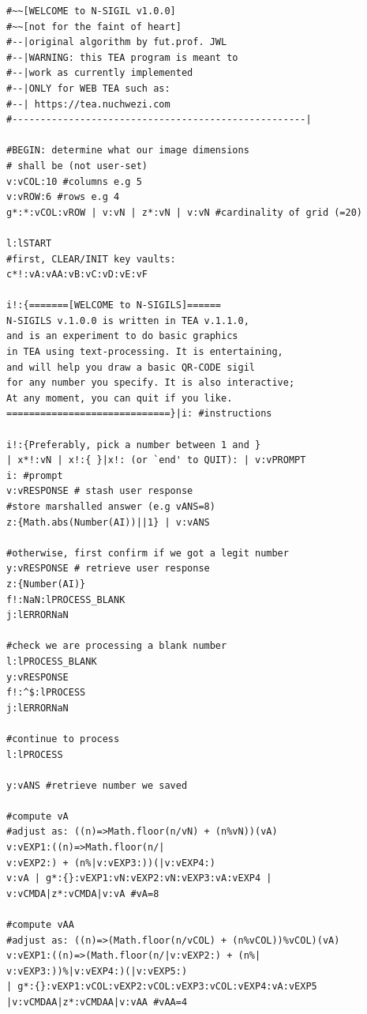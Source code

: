 \documentclass[a4paper, 18pt]{book} %
\begin{document}
 {
 \small
  \centering
  \begin{tcolorbox}[teaterminalstyle, title=TEA Program: N-SIGIL image generator program, breakable]
  \begin{lstlisting}[language=TEA,breaklines=true]
#~~[WELCOME to N-SIGIL v1.0.0]
#~~[not for the faint of heart]
#--|original algorithm by fut.prof. JWL
#--|WARNING: this TEA program is meant to 
#--|work as currently implemented
#--|ONLY for WEB TEA such as: 
#--| https://tea.nuchwezi.com
#----------------------------------------------------|

#BEGIN: determine what our image dimensions 
# shall be (not user-set)
v:vCOL:10 #columns e.g 5
v:vROW:6 #rows e.g 4
g*:*:vCOL:vROW | v:vN | z*:vN | v:vN #cardinality of grid (=20)

l:lSTART
#first, CLEAR/INIT key vaults:
c*!:vA:vAA:vB:vC:vD:vE:vF

i!:{=======[WELCOME to N-SIGILS]======
N-SIGILS v.1.0.0 is written in TEA v.1.1.0, 
and is an experiment to do basic graphics 
in TEA using text-processing. It is entertaining,
and will help you draw a basic QR-CODE sigil
for any number you specify. It is also interactive;
At any moment, you can quit if you like.
=============================}|i: #instructions

i!:{Preferably, pick a number between 1 and } 
| x*!:vN | x!:{ }|x!: (or `end' to QUIT): | v:vPROMPT
i: #prompt
v:vRESPONSE # stash user response
#store marshalled answer (e.g vANS=8)
z:{Math.abs(Number(AI))||1} | v:vANS 

#otherwise, first confirm if we got a legit number
y:vRESPONSE # retrieve user response
z:{Number(AI)} 
f!:NaN:lPROCESS_BLANK
j:lERRORNaN 

#check we are processing a blank number
l:lPROCESS_BLANK
y:vRESPONSE
f!:^$:lPROCESS
j:lERRORNaN

#continue to process
l:lPROCESS

y:vANS #retrieve number we saved

#compute vA
#adjust as: ((n)=>Math.floor(n/vN) + (n%vN))(vA)
v:vEXP1:((n)=>Math.floor(n/|
v:vEXP2:) + (n%|v:vEXP3:))(|v:vEXP4:)
v:vA | g*:{}:vEXP1:vN:vEXP2:vN:vEXP3:vA:vEXP4 |
v:vCMDA|z*:vCMDA|v:vA #vA=8

#compute vAA
#adjust as: ((n)=>(Math.floor(n/vCOL) + (n%vCOL))%vCOL)(vA)
v:vEXP1:((n)=>(Math.floor(n/|v:vEXP2:) + (n%|
v:vEXP3:))%|v:vEXP4:)(|v:vEXP5:)
| g*:{}:vEXP1:vCOL:vEXP2:vCOL:vEXP3:vCOL:vEXP4:vA:vEXP5 
|v:vCMDAA|z*:vCMDAA|v:vAA #vAA=4
 

\end{lstlisting}
\end{tcolorbox}}
\end{document}
